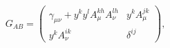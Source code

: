 \begin{equation}
G_{AB}= \begin{pmatrix} \gamma_{\mu\nu} + y^ky^lA^{kh}_{\mu}A^{lh}_{\nu} & y^kA^{jk}_{\mu} \\ y^kA^{ik}_{\nu} & \delta^{ij} \end{pmatrix},
\label{2.4}
\end{equation}

